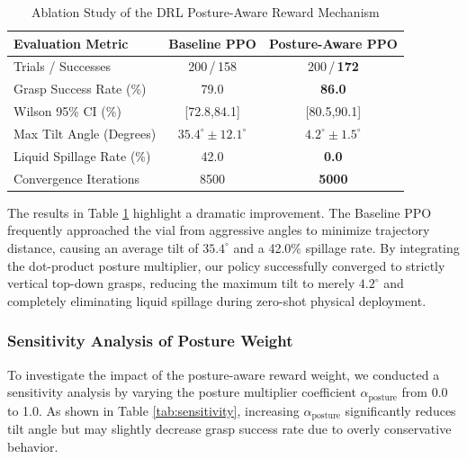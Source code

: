\begin{table}[!t]
\renewcommand{\arraystretch}{1.3}
\caption{Ablation Study of the DRL Posture-Aware Reward Mechanism}
\label{tab:rl_grasping}
\centering
\begin{tabular}{lcc}
\hline\hline
\textbf{Evaluation Metric} & \textbf{Baseline PPO} & \textbf{Posture-Aware PPO} \\ \hline
Trials / Successes & 200\,/\,158 & 200\,/\,\textbf{172} \\
Grasp Success Rate (\%) & 79.0 & \textbf{86.0} \\
Wilson 95\% CI (\%) & [72.8,84.1] & [80.5,90.1] \\
Max Tilt Angle (Degrees) & $35.4^\circ \pm 12.1^\circ$ & $\mathbf{4.2^\circ \pm 1.5^\circ}$ \\
Liquid Spillage Rate (\%) & 42.0 & \textbf{0.0} \\
Convergence Iterations & 8500 & \textbf{5000} \\ \hline\hline
\end{tabular}
\end{table}

The results in Table \ref{tab:rl_grasping} highlight a dramatic improvement. The Baseline PPO frequently approached the vial from aggressive angles to minimize trajectory distance, causing an average tilt of $35.4^\circ$ and a 42.0\% spillage rate. By integrating the dot-product posture multiplier, our policy successfully converged to strictly vertical top-down grasps, reducing the maximum tilt to merely $4.2^\circ$ and completely eliminating liquid spillage during zero-shot physical deployment.

\subsubsection{Sensitivity Analysis of Posture Weight}
\label{subsec:sensitivity_analysis}

To investigate the impact of the posture-aware reward weight, we conducted a sensitivity analysis by varying the posture multiplier coefficient $\alpha_{\text{posture}}$ from 0.0 to 1.0. As shown in Table \ref{tab:sensitivity}, increasing $\alpha_{\text{posture}}$ significantly reduces tilt angle but may slightly decrease grasp success rate due to overly conservative behavior.

